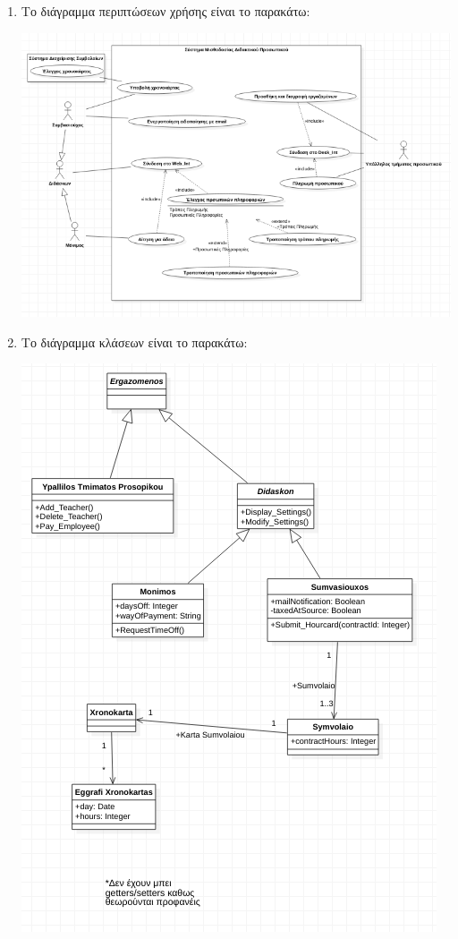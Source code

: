 \documentclass[12pt]{article}
\begin{document}
\begin{enumerate}
\item
Το διάγραμμα περιπτώσεων χρήσης είναι το παρακάτω:\\
\begin{center}
\includegraphics[scale=0.6]{use_case}
\end{center}

\item
Το διάγραμμα κλάσεων είναι το παρακάτω:\\
\begin{center}
\includegraphics[scale=0.6]{class_diag}
\end{center}


\end{enumerate}
\end{document}
